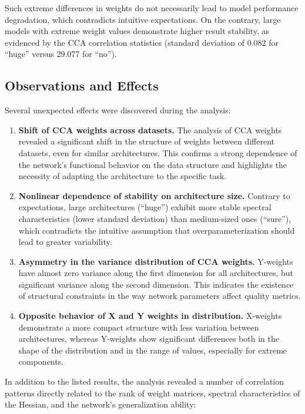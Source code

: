 \documentclass[a4paper,12pt]{article}
\begin{document}
Such extreme differences in weights do not necessarily lead to model performance degradation, which
contradicts intuitive expectations. On the contrary, large models with extreme weight values demonstrate
higher result stability, as evidenced by the CCA correlation statistics (standard deviation of 0.082 for
``huge'' versus 29.077 for ``no'').

\subsection{Observations and Effects}

Several unexpected effects were discovered during the analysis:

\begin{enumerate}
  \item \textbf{Shift of CCA weights across datasets.} The analysis of CCA weights revealed a significant
    shift in the structure of weights between different datasets, even for similar architectures. This
    confirms a strong dependence of the network's functional behavior on the data structure and highlights
    the necessity of adapting the architecture to the specific task.

  \item \textbf{Nonlinear dependence of stability on architecture size.} Contrary to expectations, large
    architectures (``huge'') exhibit more stable spectral characteristics (lower standard deviation) than
    medium-sized ones (``sure''), which contradicts the intuitive assumption that overparameterization should
    lead to greater variability.

  \item \textbf{Asymmetry in the variance distribution of CCA weights.} Y-weights have almost zero variance
    along the first dimension for all architectures, but significant variance along the second dimension.
    This indicates the existence of structural constraints in the way network parameters affect quality metrics.

  \item \textbf{Opposite behavior of X and Y weights in distribution.} X-weights demonstrate a more compact
    structure with less variation between architectures, whereas Y-weights show significant differences both
    in the shape of the distribution and in the range of values, especially for extreme components.
\end{enumerate}

In addition to the listed results, the analysis revealed a number of correlation patterns directly related to
the rank of weight matrices, spectral characteristics of the Hessian, and the network's generalization ability:
\end{document}
